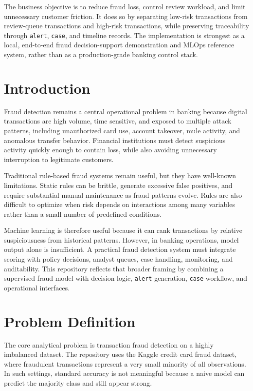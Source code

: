 \documentclass[11pt]{article}
\newcommand{\code}[1]{\texttt{#1}}
\begin{document}
The business objective is to reduce fraud loss, control review workload, and limit unnecessary customer friction. It does so by separating low-risk transactions from review-queue transactions and high-risk transactions, while preserving traceability through \code{alert}, \code{case}, and timeline records. The implementation is strongest as a local, end-to-end fraud decision-support demonstration and MLOps reference system, rather than as a production-grade banking control stack.

\section{Introduction}
Fraud detection remains a central operational problem in banking because digital transactions are high volume, time sensitive, and exposed to multiple attack patterns, including unauthorized card use, account takeover, mule activity, and anomalous transfer behavior. Financial institutions must detect suspicious activity quickly enough to contain loss, while also avoiding unnecessary interruption to legitimate customers.

Traditional rule-based fraud systems remain useful, but they have well-known limitations. Static rules can be brittle, generate excessive false positives, and require substantial manual maintenance as fraud patterns evolve. Rules are also difficult to optimize when risk depends on interactions among many variables rather than a small number of predefined conditions.

Machine learning is therefore useful because it can rank transactions by relative suspiciousness from historical patterns. However, in banking operations, model output alone is insufficient. A practical fraud detection system must integrate scoring with policy decisions, analyst queues, case handling, monitoring, and auditability. This repository reflects that broader framing by combining a supervised fraud model with decision logic, \code{alert} generation, \code{case} workflow, and operational interfaces.

\section{Problem Definition}
The core analytical problem is transaction fraud detection on a highly imbalanced dataset. The repository uses the Kaggle credit card fraud dataset, where fraudulent transactions represent a very small minority of all observations. In such settings, standard accuracy is not meaningful because a naive model can predict the majority class and still appear strong.
\end{document}
